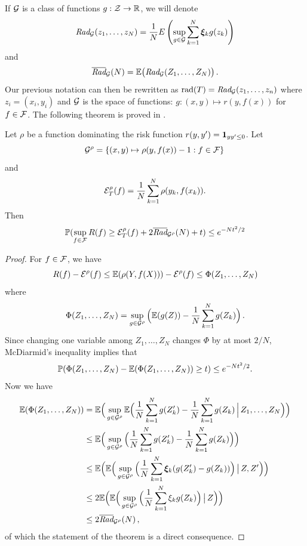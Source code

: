 If ${\mathcal G}$ is a class of functions $g: {\mathcal Z} \to {\mathbb{R}}$, we will denote
\[
\textit{Rad}_{{\mathcal G}}(z_1, \ldots, z_N) = \frac1N E\left(\sup_{g\in{\mathcal G}} \sum_{k=1}^N {\bm{\xi}}_k g(z_k)\right)
\]
and
\[
\overline{\textit{Rad}}_{{\mathcal G}}(N) = \bm{\mathbb E}\big(\textit{Rad}_{{\mathcal G}}(Z_1, \ldots, Z_N)\big)\,.
\]
Our previous notation can then be rewritten as $\mathrm{rad}(T) = \textit{Rad}_{{\mathcal G}}(z_1, \ldots, z_n)$ where $z_i = (x_i,y_i)$ and ${\mathcal G}$ is the space of functions: $g: (x,y) \mapsto r(y, f(x))$ for $f\in{\mathcal F}$. 
The following theorem is proved in \citet{koltchinskii2002empirical,bartlett2002rademacher}.  
\begin{theorem}
\label{th:rademacher}
Let $\rho$ be a function dominating the risk function $r(y,y') = {\bm 1}_{yy' \leq 0}$. Let 
\[
{\mathcal G}^\rho = \{(x,y)\mapsto \rho(y, f(x)) - 1: f\in {\mathcal F}\}\,
\]
and
\[
{\mathcal E}_{T}^\rho(f) = \frac1N \sum_{k=1}^N \rho(y_k, f(x_k)).
\]
Then 
\[
\bm{\mathbb P}(\sup_{f\in{\mathcal F}} R(f) \geq  {\mathcal E}_{T}^\rho(f) + 2\overline{\textit{Rad}}_{{\mathcal G}^\rho}(N) + t) \leq e^{-Nt^2/2}
\]
\end{theorem}
\begin{proof}
For $f\in{\mathcal F}$, we have 
\[
R(f) - {\mathcal E}^\rho(f) \leq \bm{\mathbb E}(\rho(Y, f(X))) - {\mathcal E}^\rho(f)
\leq \Phi(Z_1, \ldots, Z_N)
\]
where
\[
\Phi(Z_1, \ldots, Z_N) = \sup_{g\in{\mathcal G}^\rho} \Big(\bm{\mathbb E}(g(Z)) - \frac{1}N \sum_{k=1}^N g(Z_k)\Big)\,.
\]
Since changing one variable among $Z_1, \ldots, Z_N$ changes $\Phi$ by at most $2/N$, McDiarmid's inequality implies that
\[
\bm{\mathbb P}(\Phi(Z_1, \ldots, Z_N) - \bm{\mathbb E}(\Phi(Z_1, \ldots, Z_N)) \geq t) \leq e^{-Nt^2/2}.
\]
Now we have
\begin{align*}
\bm{\mathbb E}(\Phi(Z_1, \ldots, Z_N)) &= \bm{\mathbb E}\Big(\sup_{g\in{\mathcal G}^\rho} \bm{\mathbb E}\Big(\frac1N \sum_{k=1}^N g(Z'_k) - \frac{1}N \sum_{k=1}^N g(Z_k)\, \Big|\, Z_1, \ldots, Z_N\Big)\Big)\\
&\leq  \bm{\mathbb E}\Big(\sup_{g\in{\mathcal G}^\rho} \Big(\frac1N \sum_{k=1}^N g(Z'_k) - \frac{1}N \sum_{k=1}^N g(Z_k)\Big)\Big)\\
&\leq  \bm{\mathbb E}\Big(\bm{\mathbb E}\Big(\sup_{g\in{\mathcal G}^\rho} \Big(\frac1N \sum_{k=1}^N {\bm{\xi}}_k(g(Z'_k) - g(Z_k))\Big)\, \big |\, Z, Z'\Big)\Big)\\
&\leq  2\bm{\mathbb E}\Big(\bm{\mathbb E}\Big(\sup_{g\in{\mathcal G}^\rho} \Big(\frac1N \sum_{k=1}^N \xi_kg(Z_k)\Big)\, \big|\,Z\Big)\Big)\\
&\leq 2\overline{\textit{Rad}}_{{\mathcal G}^\rho}(N)\,,
\end{align*}
of which the statement of the theorem is a direct consequence.
\end{proof}

